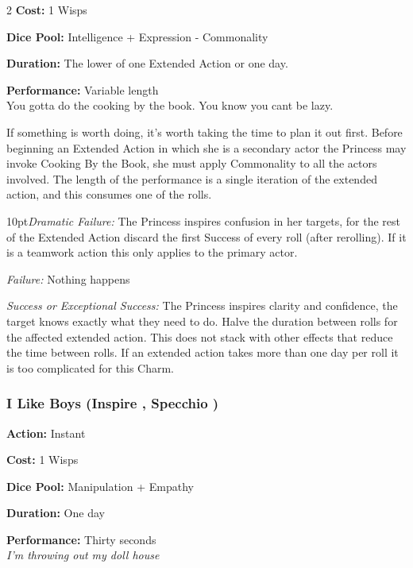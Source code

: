 \begin{multicols}{2}
\noindent \textbf{Cost:} 1 Wisps

\noindent \textbf{Dice Pool:} Intelligence + Expression - Commonality

\noindent \textbf{Duration:} The lower of one Extended Action or one day.

\noindent \textbf{Performance:} Variable length\\

\noindent You gotta do the cooking by the book. You know you cant be lazy.

If something is worth doing, it's worth taking the time to plan it out first. Before beginning an Extended Action in which she is a secondary actor the Princess may invoke Cooking By the Book, she must apply Commonality to all the actors involved. The length of the performance is a single iteration of the extended action, and this consumes one of the rolls. 

\begin{myindentpar}{10pt}\emph{Dramatic Failure:} The Princess inspires confusion in her targets, for the rest of the Extended Action discard the first Success of every roll (after rerolling). If it is a teamwork action this only applies to the primary actor. 
 
 \emph{Failure:} Nothing happens
 
 \emph{Success or Exceptional Success:} The Princess inspires clarity and confidence, the target knows exactly what they need to do. Halve the duration between rolls for the affected extended action. This does not stack with other effects that reduce the time between rolls. If an extended action takes more than one day per roll it is too complicated for this Charm.
 \end{myindentpar}

 \subsubsection*{I Like Boys (Inspire \textbullet, Specchio \textbullet)}

\noindent \textbf{Action:} Instant

\noindent \textbf{Cost:} 1 Wisps

\noindent \textbf{Dice Pool:} Manipulation + Empathy

\noindent \textbf{Duration:} One day

\noindent \textbf{Performance:} Thirty seconds \\

\noindent \textit{I'm throwing out my doll house}


\end{multicols}
